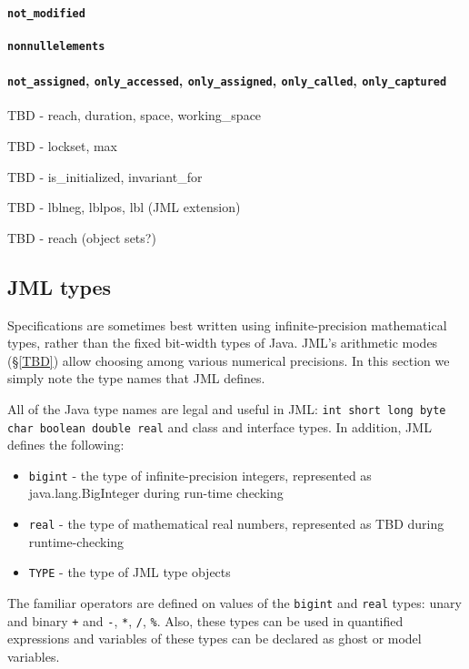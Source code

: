 \paragraph{\texttt{\bs not\_modified}}

\paragraph{\texttt{\bs nonnullelements}}

\paragraph{\texttt{\bs not\_assigned}, \texttt{\bs only\_accessed}, \texttt{\bs only\_assigned}, \texttt{\bs only\_called}, \texttt{\bs only\_captured}}

TBD - reach, duration, space, working\_space

TBD - lockset, max

TBD - is\_initialized, invariant\_for

TBD - lblneg, lblpos, lbl (JML extension)

TBD - reach (object sets?)

\subsection{JML types}
Specifications are sometimes best written using infinite-precision mathematical types, rather than the fixed bit-width types of Java.
JML's arithmetic modes (\S\ref{TBD}) allow choosing among various numerical precisions.
In this section we simply note the type names that JML defines.

All of the Java type names are legal and useful in JML: \texttt{int short long byte char boolean double real} and class and interface types. In addition, JML defines the following:
\begin{itemize}
\item \texttt{\bs bigint} - the type of infinite-precision integers, represented as java.lang.BigInteger during run-time checking
\item \texttt{\bs real} - the type of mathematical real numbers, represented as TBD during runtime-checking
\item \texttt{\bs TYPE} - the type of JML type objects
\end{itemize}

The familiar operators are defined on values of the \texttt{\bs bigint} and \texttt{\bs real} types: unary and binary \texttt{+} and \texttt{-}, \texttt{*}, \texttt{/}, \texttt{\%}. Also, these types can be used in quantified expressions and variables of these types
can be declared as ghost or model variables.
  
